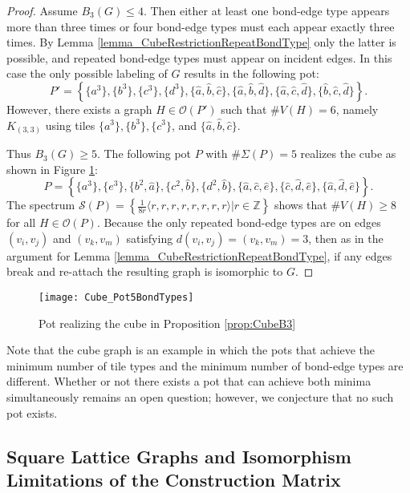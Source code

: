 \documentclass{elsarticle}
\theoremstyle{definition}
\theoremstyle{remark}
\theoremstyle{plain}
\theoremstyle{plain}
\begin{document}
\begin{proof}
Assume $B_3(G) \leq 4$. Then either at least one bond-edge type appears more than three times or four bond-edge types must each appear exactly three times. By Lemma \ref{lemma_CubeRestrictionRepeatBondType} only the latter is possible, and repeated bond-edge types must appear on incident edges. In this case the only possible labeling of $G$ results in the following pot: $$P' = \left\{\{a^3\}, \{b^3\}, \{c^3\}, \{d^3\}, \{\hat{a}, \hat{b}, \hat{c} \}, \{\hat{a}, \hat{b}, \hat{d} \}, \{\hat{a}, \hat{c}, \hat{d} \}, \{\hat{b}, \hat{c}, \hat{d} \}\right\}.$$ However, there exists a graph $ H \in \mathcal{O}(P')$ such that $\# V(H) = 6$, namely $K_{(3,3)}$ using tiles $\{a^3\}, \{b^3\}, \{c^3\}$, and $\{\hat{a}, \hat{b}, \hat{c} \}$.



Thus $B_3(G) \geq 5$. The following pot $P$ with $\#\Sigma(P) = 5$ realizes the cube as shown in Figure \ref{fig:CubeB3}:
$$P=\left\{\{a^3\}, \{e^3\}, \{b^2,\hat{a}\}, \{c^2,\hat{b}\}, \{d^2,\hat{b}\},\{\hat{a},\hat{c},\hat{e}\},\{\hat{c},\hat{d},\hat{e}\},\{\hat{a},\hat{d},\hat{e}\}\right\}.$$ The spectrum $\mathcal{S}(P)=\left\{\frac{1}{8r} \langle r,r,r,r,r,r, r, r \rangle | r \in \mathbb{Z}\right\}$ shows that $\# V(H) \geq 8$ for all $H \in \mathcal{O}(P)$. Because the only repeated bond-edge types are on edges $(v_i,v_j)$ and $(v_k, v_m)$ satisfying $d(v_i,v_j)=(v_k, v_m)=3$, then as in the argument for Lemma \ref{lemma_CubeRestrictionRepeatBondType}, if any edges break and re-attach the resulting graph is isomorphic to $G$. 
\end{proof}
     \begin{figure}
      \centering
      \texttt{[image: Cube\_Pot5BondTypes]}
      \caption{Pot realizing the cube in Proposition \ref{prop:CubeB3}}
      \label{fig:CubeB3}
  \end{figure}

Note that the cube graph is an example in which the pots that achieve the minimum number of tile types and the minimum number of bond-edge types are different. Whether or not there exists a pot that can achieve both minima simultaneously remains an open question; however, we conjecture that no such pot exists.

  


\subsection{Square Lattice Graphs and Isomorphism Limitations of the Construction Matrix} \label{sec:squarelattice}
\end{document}
